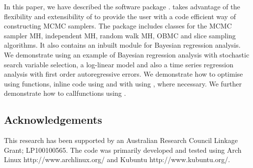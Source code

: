 \documentclass[article]{jss}
\begin{document}
In this paper, we have described the  software
package .   takes advantage of the flexibility
and extensibility of  to provide the user with a code
efficient way of constructing MCMC samplers. The  package
includes classes for the MCMC sampler MH, independent MH, random walk
MH, OBMC and slice sampling algorithms.  It also contains an inbuilt
module for Bayesian regression analysis.  We demonstrate 
using an example of Bayesian regression analysis with stochastic
search variable selection, a log-linear model and also a time series
regression analysis with first order autoregressive errors. We
demonstrate how to optimise  using  functions,
inline  code using  and with
 using , where necessary.  We further
demonstrate how to callfunctions using .


\subsection*{Acknowledgements}

This research has been supported by an Australian Research Council
Linkage Grant; LP100100565. The code was primarily developed and
tested using Arch Linux http://www.archlinux.org/ and Kubuntu
http://www.kubuntu.org/.


\end{document}
